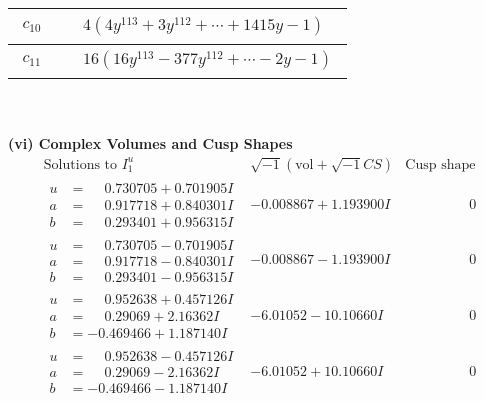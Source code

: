 \documentclass[1p]{elsarticle_modified}
\theoremstyle{definition}
\newcommand{\I}{\sqrt{-1}}
\begin{document}
\begin{tabular}{m{50pt}|m{274pt}}
\hline $$\begin{aligned}c_{10}\end{aligned}$$&$\begin{aligned}
&4(4 y^{113}+3 y^{112}+\cdots+1415 y-1)
\end{aligned}$\\
\hline $$\begin{aligned}c_{11}\end{aligned}$$&$\begin{aligned}
&16(16 y^{113}-377 y^{112}+\cdots-2 y-1)
\end{aligned}$\\
\hline
\end{tabular}\\~\\
\newpage\flushleft \textbf{(vi) Complex Volumes and Cusp Shapes}
$$\begin{array}{c|c|c}  
\text{Solutions to }I^u_{1}& \I (\text{vol} + \sqrt{-1}CS) & \text{Cusp shape}\\
 \hline 
\begin{aligned}
u &= \phantom{-}0.730705 + 0.701905 I \\
a &= \phantom{-}0.917718 + 0.840301 I \\
b &= \phantom{-}0.293401 + 0.956315 I\end{aligned}
 & -0.008867 + 1.193900 I & \phantom{-0.000000 } 0 \\ \hline\begin{aligned}
u &= \phantom{-}0.730705 - 0.701905 I \\
a &= \phantom{-}0.917718 - 0.840301 I \\
b &= \phantom{-}0.293401 - 0.956315 I\end{aligned}
 & -0.008867 - 1.193900 I & \phantom{-0.000000 } 0 \\ \hline\begin{aligned}
u &= \phantom{-}0.952638 + 0.457126 I \\
a &= \phantom{-}0.29069 + 2.16362 I \\
b &= -0.469466 + 1.187140 I\end{aligned}
 & -6.01052 - 10.10660 I & \phantom{-0.000000 } 0 \\ \hline\begin{aligned}
u &= \phantom{-}0.952638 - 0.457126 I \\
a &= \phantom{-}0.29069 - 2.16362 I \\
b &= -0.469466 - 1.187140 I\end{aligned}
 & -6.01052 + 10.10660 I & \phantom{-0.000000 } 0 \\ \hline\begin{aligned}

\end{aligned}
\end{array}$$
\end{document}
